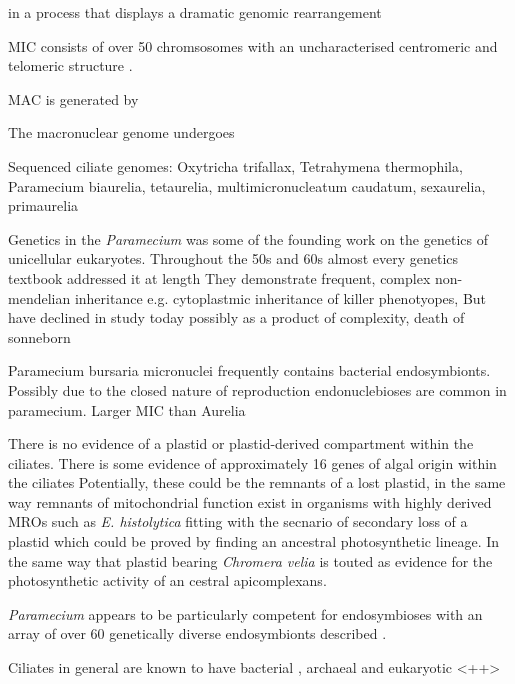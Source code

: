 in a process that displays
a dramatic genomic rearrangement

MIC consists of over 50 chromsosomes with an uncharacterised centromeric and telomeric structure \citep{Aury2006}.

MAC is generated by 



The macronuclear genome undergoes 




Sequenced ciliate genomes: Oxytricha trifallax, Tetrahymena thermophila, Paramecium biaurelia, tetaurelia, multimicronucleatum
caudatum, sexaurelia, primaurelia



Genetics in the \textit{Paramecium} was some of the founding work on the genetics of unicellular eukaryotes.
Throughout the 50s and 60s almost every genetics textbook addressed it at length 
They demonstrate frequent, complex non-mendelian inheritance e.g. cytoplastmic inheritance of killer phenotyopes, 
But have declined in study today possibly as a product of complexity, death of sonneborn \citep{Preer1997}


Paramecium bursaria micronuclei frequently contains bacterial endosymbionts.  Possibly due to the closed
nature of reproduction endonuclebioses are common in paramecium.  Larger MIC than Aurelia \citep{Gortz2009}



There is no evidence of a plastid or plastid-derived compartment within the ciliates.
There is some evidence of approximately 16 genes of algal origin within the ciliates 
Potentially, these could be the remnants of a lost plastid, in the same way remnants of mitochondrial function 
exist in organisms with highly derived MROs such as \textit{E. histolytica} fitting with the secnario of
secondary loss of a plastid which could be proved by finding an ancestral photosynthetic lineage.
In the same way that plastid bearing \textit{Chromera velia} is touted as evidence for the photosynthetic activity
of an cestral apicomplexans. \citep{Reyes-Prieto2008}



\textit{Paramecium} appears to be particularly competent for endosymbioses with an array of over 60 
genetically diverse endosymbionts described \citep{Gortz2009}.

Ciliates in general are known to have bacterial \citep{Gortz2009}, archaeal \citep{Wrede2012} and eukaryotic \citep{}<++>



